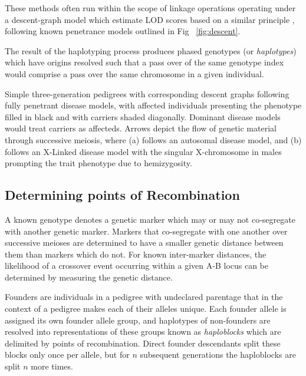 These methods often run within the scope of linkage operations operating under a descent-graph model which estimate LOD scores based on a similar principle \citep{sobel1996descent}, following known penetrance models outlined in Fig ~\ref{fig:descent}.

The result of the haplotyping process produces phased genotypes (or \textit{haplotypes}) which have origins resolved such that a pass over of the same genotype index would comprise a pass over the same chromosome in a given individual.

	{Simple three-generation pedigrees with corresponding descent graphs following fully penetrant disease models, with affected individuals presenting the phenotype filled in black and with carriers shaded diagonally. Dominant disease models would treat carriers as affecteds. Arrows depict the flow of genetic material through successive meiosis, where (a) follows an autosomal disease model, and (b) follows an X-Linked disease model with the singular X-chromosome in males prompting the trait phenotype due to hemizygosity.}

\vspace{-10pt}
\subsection{Determining points of Recombination}

\enlargethispage{20pt}
A known genotype denotes a genetic marker which may or may not co-segregate with another genetic marker. Markers that co-segregate with one another over successive meioses are determined to have a smaller genetic distance between them than markers which do not. For known inter-marker distances, the likelihood of a crossover event occurring within a given A-B locus can be determined by measuring the genetic distance.


Founders are individuals in a pedigree with undeclared parentage that in the context of a pedigree makes each of their alleles unique. Each founder allele is assigned its own founder allele group, and haplotypes of non-founders are resolved into representations of these groups known as \textit{haploblocks} which are delimited by points of recombination. Direct founder descendants split these blocks only once per allele, but for $n$ subsequent generations the haploblocks are split $n$ more times.

